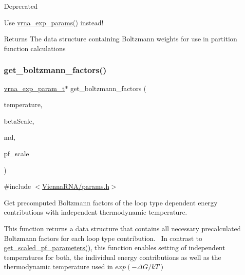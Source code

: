 \begin{DoxyRefDesc}{Deprecated}
\item[\mbox{\hyperlink{deprecated__deprecated000094}{Deprecated}}]Use \mbox{\hyperlink{group__energy__parameters_gab1f3016f96aa96bff020cdd904605afa}{vrna\+\_\+exp\+\_\+params()}} instead!\end{DoxyRefDesc}


\begin{DoxyReturn}{Returns}
The data structure containing Boltzmann weights for use in partition function calculations 
\end{DoxyReturn}
\mbox{\label{group__energy__parameters_gaef2b931c7e9d4ffb0a5c33df50ec2068}} 
\subsubsection{\texorpdfstring{get\+\_\+boltzmann\+\_\+factors()}{get\_boltzmann\_factors()}}
{\footnotesize\ttfamily \mbox{\hyperlink{group__energy__parameters_ga01d8b92fe734df8d79a6169482c7d8d8}{vrna\+\_\+exp\+\_\+param\+\_\+t}}$\ast$ get\+\_\+boltzmann\+\_\+factors (\begin{DoxyParamCaption}\item[{double}]{temperature,  }\item[{double}]{beta\+Scale,  }\item[{\mbox{\hyperlink{group__model__details_ga1f8a10e12a0a1915f2a4eff0b28ea17c}{vrna\+\_\+md\+\_\+t}}}]{md,  }\item[{double}]{pf\+\_\+scale }\end{DoxyParamCaption})}



{\ttfamily \#include $<$\mbox{\hyperlink{params_8h}{Vienna\+R\+N\+A/params.\+h}}$>$}



Get precomputed Boltzmann factors of the loop type dependent energy contributions with independent thermodynamic temperature. 

This function returns a data structure that contains all necessary precalculated Boltzmann factors for each loop type contribution.~\newline
 In contrast to \mbox{\hyperlink{group__energy__parameters_gabf3b9271c41dd3fac02d56e0b02b3344}{get\+\_\+scaled\+\_\+pf\+\_\+parameters()}}, this function enables setting of independent temperatures for both, the individual energy contributions as well as the thermodynamic temperature used in $ exp(-\Delta G / kT) $

